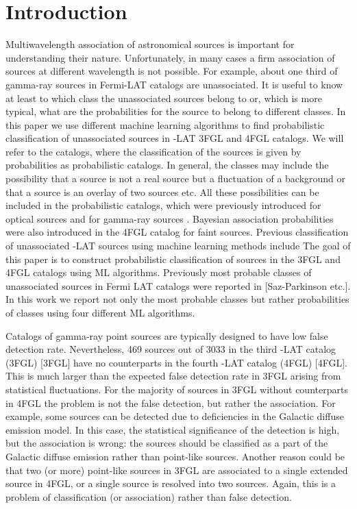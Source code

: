 \section{Introduction}

Multiwavelength association of astronomical sources is important for understanding their nature.
Unfortunately, in many cases a firm association of sources at different wavelength is not possible.
For example, about one third of gamma-ray sources in Fermi-LAT catalogs are unassociated.
It is useful to know at least to which class the unassociated sources belong to or, which is more typical,
what are the probabilities for the source to belong to different classes.
In this paper we use different machine learning algorithms to find probabilistic classification of
unassociated sources in \Fermi-LAT 3FGL \citep{2015ApJS..218...23A} and 4FGL \citep{2020ApJS..247...33A} catalogs.
We will refer to the catalogs, where the classification of the sources is given by probabilities as probabilistic catalogs.
In general, the classes may include the possibility that a source is not a real source but a fluctuation of a background 
or that a source is an overlay of two sources etc.
All these possibilities can be included in the probabilistic catalogs, which were previously introduced for optical sources 
\citep[e.g.,][]{2010EAS....45..351H, 2013AJ....146....7B}
and for gamma-ray sources \citep{2017ApJ...839....4D}.
Bayesian association probabilities were also introduced in the 4FGL catalog \citep{2020ApJS..247...33A} for faint sources.
Previous classification of unassociated \Fermi-LAT sources using machine learning methods include 
The goal of this paper is to construct probabilistic classification of sources in the 3FGL and 4FGL catalogs using ML algorithms.
Previously most probable classes of unassociated sources in Fermi LAT catalogs were reported in
[Saz-Parkinson etc.].
In this work we report not only the most probable classes but rather probabilities of classes using four different ML algorithms.

Catalogs of gamma-ray point sources are typically designed to have low false detection rate. 
Nevertheless, 469 sources out of 3033 in the third \Fermi-LAT catalog (3FGL) [3FGL] have no counterparts 
in the fourth \Fermi-LAT catalog (4FGL) [4FGL].
This is much larger than the expected false detection rate in 3FGL arising from statistical fluctuations.
For the majority of sources in 3FGL without counterparts in 4FGL the problem is not the false detection, 
but rather the association.
For example, some sources can be detected due to deficiencies in the Galactic diffuse emission model.
In this case, the statistical significance of the detection is high, but the association is wrong: the sources should be classified as
a part of the Galactic diffuse emission rather than point-like sources.
Another reason could be that two (or more) point-like sources in 3FGL are associated to a single extended source in 4FGL,
or a single source is resolved into two sources.
Again, this is a problem of classification (or association) rather than false detection.

